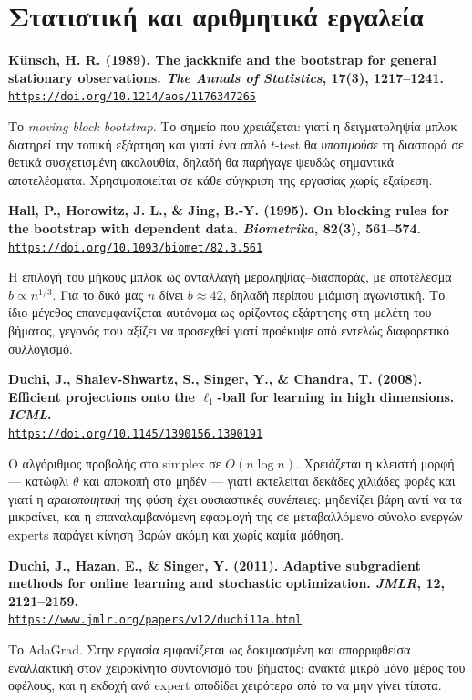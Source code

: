 \documentclass[11pt,a4paper]{article}
\newcommand{\src}[3]{%
  \par\medskip\noindent\textbf{#2}\\
  \href{#3}{\texttt{\small #3}}\par\smallskip}
\begin{document}
\section{Στατιστική και αριθμητικά εργαλεία}

\src{kunsch1989}{Künsch, H. R. (1989). The jackknife and the bootstrap for general stationary
observations. \emph{The Annals of Statistics}, 17(3), 1217--1241.}
{https://doi.org/10.1214/aos/1176347265}
Το \emph{moving block bootstrap}. Το σημείο που χρειάζεται: γιατί η δειγματοληψία μπλοκ
διατηρεί την τοπική εξάρτηση και γιατί ένα απλό $t$-test θα \emph{υποτιμούσε} τη διασπορά σε
θετικά συσχετισμένη ακολουθία, δηλαδή θα παρήγαγε ψευδώς σημαντικά αποτελέσματα. Χρησιμοποιείται
σε κάθε σύγκριση της εργασίας χωρίς εξαίρεση.

\src{hall1995}{Hall, P., Horowitz, J. L., \& Jing, B.-Y. (1995). On blocking rules for the
bootstrap with dependent data. \emph{Biometrika}, 82(3), 561--574.}
{https://doi.org/10.1093/biomet/82.3.561}
Η επιλογή του μήκους μπλοκ ως ανταλλαγή μεροληψίας--διασποράς, με αποτέλεσμα
$b \propto n^{1/3}$. Για το δικό μας $n$ δίνει $b\approx42$, δηλαδή περίπου μιάμιση
αγωνιστική. Το ίδιο μέγεθος επανεμφανίζεται αυτόνομα ως ορίζοντας εξάρτησης στη μελέτη του
βήματος, γεγονός που αξίζει να προσεχθεί γιατί προέκυψε από εντελώς διαφορετικό συλλογισμό.

\src{duchi2008}{Duchi, J., Shalev-Shwartz, S., Singer, Y., \& Chandra, T. (2008). Efficient
projections onto the $\ell_1$-ball for learning in high dimensions. \emph{ICML}.}
{https://doi.org/10.1145/1390156.1390191}
Ο αλγόριθμος προβολής στο simplex σε $O(n\log n)$. Χρειάζεται η κλειστή μορφή --- κατώφλι
$\theta$ και αποκοπή στο μηδέν --- γιατί εκτελείται δεκάδες χιλιάδες φορές και γιατί η
\emph{αραιοποιητική} της φύση έχει ουσιαστικές συνέπειες: μηδενίζει βάρη αντί να τα μικραίνει,
και η επαναλαμβανόμενη εφαρμογή της σε μεταβαλλόμενο σύνολο ενεργών experts παράγει κίνηση
βαρών ακόμη και χωρίς καμία μάθηση.

\src{duchi2011}{Duchi, J., Hazan, E., \& Singer, Y. (2011). Adaptive subgradient methods for
online learning and stochastic optimization. \emph{JMLR}, 12, 2121--2159.}
{https://www.jmlr.org/papers/v12/duchi11a.html}
Το AdaGrad. Στην εργασία εμφανίζεται ως δοκιμασμένη και απορριφθείσα εναλλακτική στον
χειροκίνητο συντονισμό του βήματος: ανακτά μικρό μόνο μέρος του οφέλους, και η εκδοχή ανά
expert αποδίδει χειρότερα από το να μην γίνει τίποτα.
\end{document}
